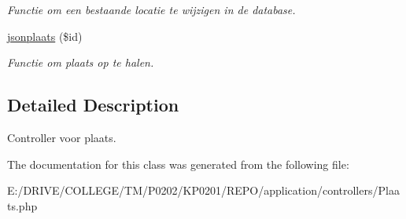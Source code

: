 \begin{DoxyCompactItemize}
\begin{DoxyCompactList}\small\item\em Functie om een bestaande locatie te wijzigen in de database. \end{DoxyCompactList}\item 
\mbox{\label{class_plaats_a7071ac3422060575601bab2b2065cf31}} 
\mbox{\hyperlink{class_plaats_a7071ac3422060575601bab2b2065cf31}{jsonplaats}} (\$id)
\begin{DoxyCompactList}\small\item\em Functie om plaats op te halen. \end{DoxyCompactList}\end{DoxyCompactItemize}


\subsection{Detailed Description}
Controller voor plaats. 

The documentation for this class was generated from the following file\+:\begin{DoxyCompactItemize}
\item 
E\+:/\+D\+R\+I\+V\+E/\+C\+O\+L\+L\+E\+G\+E/\+T\+M/\+P0202/\+K\+P0201/\+R\+E\+P\+O/application/controllers/Plaats.\+php\end{DoxyCompactItemize}
